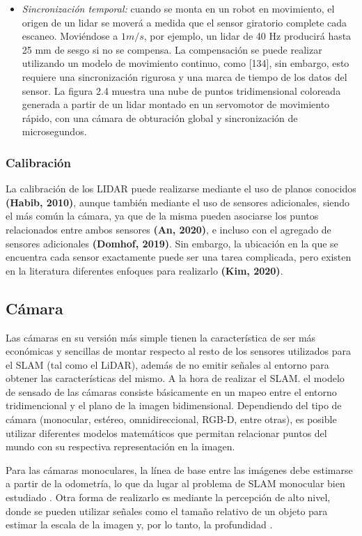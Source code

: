 \begin{itemize}
    \item \textit{Sincronización temporal:} cuando se monta en un robot en movimiento, el origen de un lidar se moverá a medida que el sensor giratorio complete cada escaneo. Moviéndose a $1m/s$, por ejemplo, un lidar de 40 Hz producirá hasta 25 mm de sesgo si no se compensa. La compensación se puede realizar utilizando un modelo de movimiento continuo, como [134], sin embargo, esto requiere una sincronización rigurosa y una marca de tiempo de los datos del sensor. La figura 2.4 muestra una nube de puntos tridimensional coloreada generada a partir de un lidar montado en un servomotor de movimiento rápido, con una cámara de obturación global y sincronización de microsegundos.
\end{itemize}

\subsubsection{Calibración}
La calibración de los LIDAR puede realizarse mediante el uso de planos conocidos \textbf{(Habib, 2010)}, aunque también mediante el uso de sensores adicionales, siendo el más común la cámara, ya que de la misma pueden asociarse los puntos relacionados entre ambos sensores \textbf{(An, 2020)}, e incluso con el agregado de sensores adicionales \textbf{(Domhof, 2019)}. Sin embargo, la ubicación en la que se encuentra cada sensor exactamente puede ser una tarea complicada, pero existen en la literatura diferentes enfoques para realizarlo \textbf{(Kim, 2020)}.
\fi

\subsection{Cámara}
Las cámaras en su versión más simple tienen la característica de ser más económicas y sencillas de montar respecto al resto de los sensores utilizados para el SLAM (tal como el LiDAR), además de no emitir señales al entorno para obtener las características del mismo. A la hora de realizar el SLAM. el modelo de sensado de las cámaras consiste básicamente en un mapeo entre el entorno tridimencional y el plano de la imagen bidimensional. Dependiendo del tipo de cámara (monocular, estéreo, omnidireccional, RGB-D, entre otras), es posible utilizar diferentes modelos matemáticos que permitan relacionar puntos del mundo con su respectiva representación en la imagen.

Para las cámaras monoculares, la línea de base entre las imágenes debe estimarse a partir de la odometría, lo que da lugar al problema de SLAM monocular bien estudiado \cite{sola2007,murray2007,davison2007}. Otra forma de realizarlo es mediante la percepción de alto nivel, donde se pueden utilizar señales como el tamaño relativo de un objeto para estimar la escala de la imagen y, por lo tanto, la profundidad \cite{botterill2013}.

